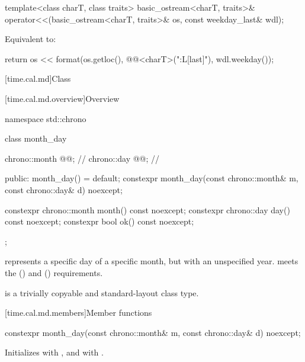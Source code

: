 %
\begin{itemdecl}
template<class charT, class traits>
  basic_ostream<charT, traits>&
    operator<<(basic_ostream<charT, traits>& os, const weekday_last& wdl);
\end{itemdecl}

\begin{itemdescr}
\pnum
\effects
Equivalent to:
\begin{codeblock}
return os << format(os.getloc(), @@<charT>("{:L}[last]"), wdl.weekday());
\end{codeblock}
\end{itemdescr}

[time.cal.md]{Class }

[time.cal.md.overview]{Overview}

\begin{codeblock}
namespace std::chrono {
  class month_day {
    chrono::month @@;           // \expos
    chrono::day   @@;           // \expos

  public:
    month_day() = default;
    constexpr month_day(const chrono::month& m, const chrono::day& d) noexcept;

    constexpr chrono::month month() const noexcept;
    constexpr chrono::day   day()   const noexcept;
    constexpr bool ok() const noexcept;
  };
}
\end{codeblock}

\pnum
{} represents a specific day of a specific month,
but with an unspecified year.
 meets the  ()
and  () requirements.

\pnum
{} is a trivially copyable and standard-layout class type.

[time.cal.md.members]{Member functions}

%
\begin{itemdecl}
constexpr month_day(const chrono::month& m, const chrono::day& d) noexcept;
\end{itemdecl}

\begin{itemdescr}
\pnum
\effects
Initializes  with , and  with .
\end{itemdescr}

